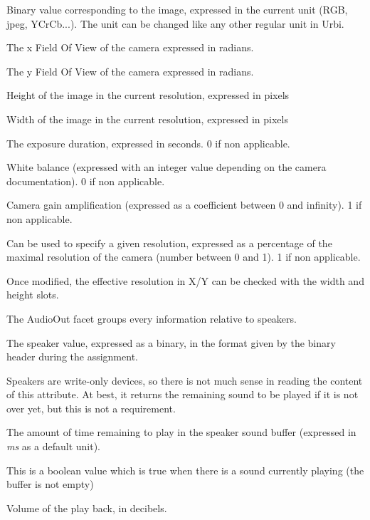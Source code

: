 \begin{slots}
  {%
    Binary value corresponding to the image, expressed in the current
    unit (RGB, jpeg, YCrCb...). The unit can be changed like any other
    regular unit in Urbi. %
  }

  {%
    The x Field Of View of the camera expressed in radians.%
  }

  {%
    The y Field Of View of the camera expressed in radians.%
  }

  {%
    Height of the image in the current resolution, expressed in
    pixels%
  }

  {%
    Width of the image in the current resolution, expressed in pixels%
  }

  {%
    The exposure duration, expressed in seconds. 0 if non applicable.%
  }

  {%
    White balance (expressed with an integer value depending on the
    camera documentation). 0 if non applicable.%
  }

  {%
    Camera gain amplification (expressed as a coefficient between 0
    and infinity). 1 if non applicable.%
  }

  {%
    Can be used to specify a given resolution, expressed as a
    percentage of the maximal resolution of the camera (number between
    0 and 1). 1 if non applicable.

    Once modified, the effective resolution in X/Y can be checked with
    the width and height slots.%
  }

\end{slots}

The AudioOut facet groups every information relative to speakers.

\begin{slots}
  {%
    The speaker value, expressed as a binary, in the format given by
    the binary header during the assignment.

    Speakers are write-only devices, so there is not much sense in
    reading the content of this attribute. At best, it returns the
    remaining sound to be played if it is not over yet, but this is
    not a requirement.%
  }

  {%
    The amount of time remaining to play in the speaker sound buffer
    (expressed in \textit{ms} as a default unit).%
  }

  {%
    This is a boolean value which is true when there is a sound
    currently playing (the buffer is not empty)%
  }

  {%
    Volume of the play back, in decibels.%
  }
\end{slots}




